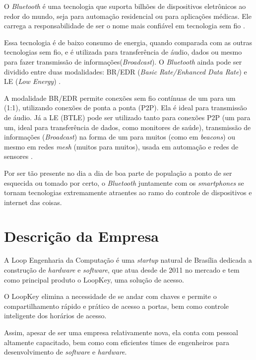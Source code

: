 \documentclass[12pt,fleqn]{article}
\begin{document}
\hspace*{1.25cm}  O \textit{Bluetooth}  é uma tecnologia que suporta bilhões de dispositivos
 eletrônicos ao redor do mundo, seja para automação residencial ou para  aplicações médicas.
 Ele carrega a responsabilidade de ser o nome mais confiável em 
 tecnologia sem fio \cite{bluetooth}.  


Essa tecnologia é de baixo consumo de energia, quando comparada com as outras tecnologias sem fio, e  é utilizada para transferência de áudio,
dados ou mesmo para fazer transmissão de informações(\textit{Broadcast}). O \textit{Bluetooth} ainda pode ser dividido entre duas modalidades: 
BR/EDR (\textit{Basic Rate/Enhanced Data Rate}) e LE (\textit{Low Energy})  \cite{bluetooth}.


A modalidade BR/EDR permite conexões sem fio contínuas de um para um (1:1), 
utilizando conexões de ponta a ponta (P2P). Ela é ideal para transmissão 
de áudio. Já a  LE (BTLE) pode ser utilizado tanto para conexões P2P (um para um, ideal para transferência de dados, como monitores de saúde), 
transmissão de informações (\textit{Broadcast}) na forma de um 
para muitos (como em \textit{beacons}) ou mesmo em redes \textit{mesh} (muitos para muitos), 
usada em automação e redes de sensores \cite{bluetooth}.

Por ser tão presente no dia a dia de boa parte de população a ponto de ser esquecida ou tomado por certo, o \textit{Bluetooth} juntamente
com os \textit{smartphones} se tornam tecnologias extremamente atraentes ao ramo do controle de dispositivos e internet das coisas.

\section{Descrição da Empresa}   


\hspace*{1.25cm} A Loop Engenharia da Computação \cite{loop} é uma  \textit{startup} natural de Brasília  dedicada a 
construção de \textit{hardware} e  \textit{software},  que atua desde de 2011 no mercado e 
tem como principal produto o LoopKey, uma solução de acesso.


O LoopKey elimina a necessidade de se andar com chaves e permite o compartilhamento rápido e prático
de acesso a portas, bem como controle inteligente dos horários de acesso.

Assim, apesar de ser uma empresa relativamente nova, ela conta com pessoal altamente capacitado, bem como com eficientes times de
engenheiros para desenvolvimento de \textit{software} e \textit{hardware}.
\end{document}

